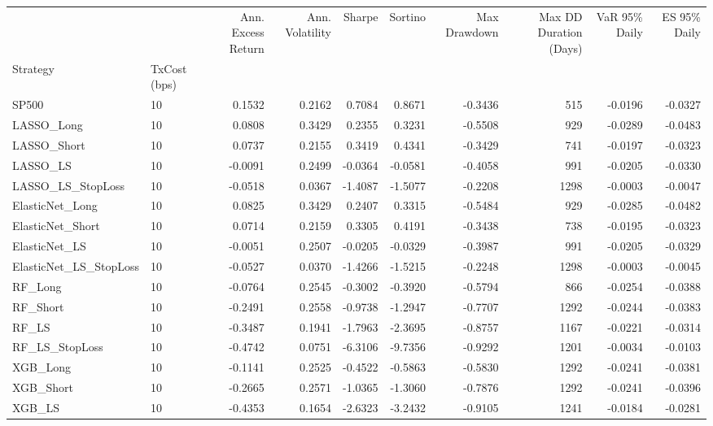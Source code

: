 \begin{tabular}{llrrrrrrrr}
\toprule
 &  & Ann. Excess Return & Ann. Volatility & Sharpe & Sortino & Max Drawdown & Max DD Duration (Days) & VaR 95\% Daily & ES 95\% Daily \\
Strategy & TxCost (bps) &  &  &  &  &  &  &  &  \\
\midrule
SP500 & 10 & 0.1532 & 0.2162 & 0.7084 & 0.8671 & -0.3436 & 515 & -0.0196 & -0.0327 \\
\cline{1-10}
LASSO\_Long & 10 & 0.0808 & 0.3429 & 0.2355 & 0.3231 & -0.5508 & 929 & -0.0289 & -0.0483 \\
\cline{1-10}
LASSO\_Short & 10 & 0.0737 & 0.2155 & 0.3419 & 0.4341 & -0.3429 & 741 & -0.0197 & -0.0323 \\
\cline{1-10}
LASSO\_LS & 10 & -0.0091 & 0.2499 & -0.0364 & -0.0581 & -0.4058 & 991 & -0.0205 & -0.0330 \\
\cline{1-10}
LASSO\_LS\_StopLoss & 10 & -0.0518 & 0.0367 & -1.4087 & -1.5077 & -0.2208 & 1298 & -0.0003 & -0.0047 \\
\cline{1-10}
ElasticNet\_Long & 10 & 0.0825 & 0.3429 & 0.2407 & 0.3315 & -0.5484 & 929 & -0.0285 & -0.0482 \\
\cline{1-10}
ElasticNet\_Short & 10 & 0.0714 & 0.2159 & 0.3305 & 0.4191 & -0.3438 & 738 & -0.0195 & -0.0323 \\
\cline{1-10}
ElasticNet\_LS & 10 & -0.0051 & 0.2507 & -0.0205 & -0.0329 & -0.3987 & 991 & -0.0205 & -0.0329 \\
\cline{1-10}
ElasticNet\_LS\_StopLoss & 10 & -0.0527 & 0.0370 & -1.4266 & -1.5215 & -0.2248 & 1298 & -0.0003 & -0.0045 \\
\cline{1-10}
RF\_Long & 10 & -0.0764 & 0.2545 & -0.3002 & -0.3920 & -0.5794 & 866 & -0.0254 & -0.0388 \\
\cline{1-10}
RF\_Short & 10 & -0.2491 & 0.2558 & -0.9738 & -1.2947 & -0.7707 & 1292 & -0.0244 & -0.0383 \\
\cline{1-10}
RF\_LS & 10 & -0.3487 & 0.1941 & -1.7963 & -2.3695 & -0.8757 & 1167 & -0.0221 & -0.0314 \\
\cline{1-10}
RF\_LS\_StopLoss & 10 & -0.4742 & 0.0751 & -6.3106 & -9.7356 & -0.9292 & 1201 & -0.0034 & -0.0103 \\
\cline{1-10}
XGB\_Long & 10 & -0.1141 & 0.2525 & -0.4522 & -0.5863 & -0.5830 & 1292 & -0.0241 & -0.0381 \\
\cline{1-10}
XGB\_Short & 10 & -0.2665 & 0.2571 & -1.0365 & -1.3060 & -0.7876 & 1292 & -0.0241 & -0.0396 \\
\cline{1-10}
XGB\_LS & 10 & -0.4353 & 0.1654 & -2.6323 & -3.2432 & -0.9105 & 1241 & -0.0184 & -0.0281 \\

\end{tabular}
